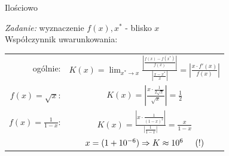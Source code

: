 \begin{frame}{Ilościowo}

	{\it Zadanie:} wyznaczenie $f(x), x^{*}$ - blisko $x$ \\
    Współczynnik uwarunkowania:
    
    \vspace{.5cm}
    \centering
    \begin{tabular}{r c}
    	ogólnie: & \(
            K(x) = \lim_{x^{*} \to x} \frac{
                \left| \frac{
                    f(x) - f(x^{*})
                }{
                    f(x)
                } \right|
            }{
                \left| \frac{
                    x - x^{*}
                }{
                    x
                } \right|
            } = \left| \frac{
                x \cdot f'(x)
            }{
                f(x)
            } \right|
        \)\\
        
        $f(x) = \sqrt{x}$: & \(
        	K(x) = \left| \frac{
                x \cdot \frac{1}{2 \sqrt{x}}
            }{
                \sqrt{x}
            }\right| = \frac{1}{2}
        \) \\
        
        $f(x) = \frac{1}{1 - x}$: & \(
            K(x) = \frac{ \left|
                x \cdot \frac{1}{
                    (1-x)^2
                } \right| 
            }{ \left| 
                \frac{1}{1 - x}
            \right| } = \frac{x}{1 - x}
          	\) \\
            & \(
            x = (1 + 10^{-6}) \Rightarrow K \approx 10^6 \hspace{.5cm} (!)
            \)
    \end{tabular}
\end{frame}
